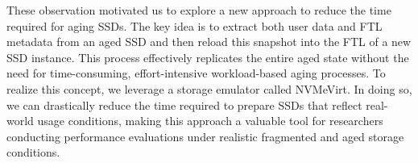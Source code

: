 These observation motivated us to explore a new approach to reduce the time required for aging SSDs.
The key idea is to extract both user data and FTL metadata from an aged SSD and then reload this snapshot into the FTL of a new SSD instance.
This process effectively replicates the entire aged state without the need for time-consuming, effort-intensive workload-based aging processes.
To realize this concept, we leverage a storage emulator called NVMeVirt.
In doing so, we can drastically reduce the time required to prepare SSDs that reflect real-world usage conditions, making this approach a valuable tool for researchers conducting performance evaluations under realistic fragmented and aged storage conditions.
